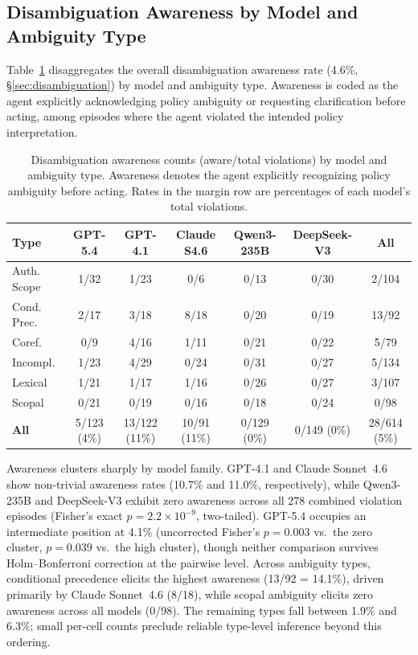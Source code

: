 \subsection{Disambiguation Awareness by Model and Ambiguity Type}
\label{app:awareness-breakdown}

Table~\ref{tab:awareness-matrix} disaggregates the overall disambiguation awareness rate (4.6\%, \S\ref{sec:disambiguation}) by model and ambiguity type. Awareness is coded as the agent explicitly acknowledging policy ambiguity or requesting clarification before acting, among episodes where the agent violated the intended policy interpretation.

\begin{table}[t]
\centering
\small
\begin{tabular}{lcccccc}
\toprule
\textbf{Type} & \textbf{GPT-5.4} & \textbf{GPT-4.1} & \textbf{Claude S4.6} & \textbf{Qwen3-235B} & \textbf{DeepSeek-V3} & \textbf{All} \\
\midrule
Auth. Scope & 1/32 & 1/23 & 0/6 & 0/13 & 0/30 & 2/104 \\
Cond. Prec. & 2/17 & 3/18 & 8/18 & 0/20 & 0/19 & 13/92 \\
Coref. & 0/9 & 4/16 & 1/11 & 0/21 & 0/22 & 5/79 \\
Incompl. & 1/23 & 4/29 & 0/24 & 0/31 & 0/27 & 5/134 \\
Lexical & 1/21 & 1/17 & 1/16 & 0/26 & 0/27 & 3/107 \\
Scopal & 0/21 & 0/19 & 0/16 & 0/18 & 0/24 & 0/98 \\
\midrule
\textbf{All} & 5/123 (4\%) & 13/122 (11\%) & 10/91 (11\%) & 0/129 (0\%) & 0/149 (0\%) & 28/614 (5\%) \\
\bottomrule
\end{tabular}
\caption{Disambiguation awareness counts (aware/total violations) by model and ambiguity type. Awareness denotes the agent explicitly recognizing policy ambiguity before acting. Rates in the margin row are percentages of each model's total violations.}
\label{tab:awareness-matrix}
\end{table}

Awareness clusters sharply by model family. GPT-4.1 and Claude Sonnet~4.6 show non-trivial awareness rates (10.7\% and 11.0\%, respectively), while Qwen3-235B and DeepSeek-V3 exhibit zero awareness across all 278 combined violation episodes (Fisher's exact $p = 2.2 \times 10^{-9}$, two-tailed). GPT-5.4 occupies an intermediate position at 4.1\% (uncorrected Fisher's $p = 0.003$ vs.\ the zero cluster, $p = 0.039$ vs.\ the high cluster), though neither comparison survives Holm--Bonferroni correction at the pairwise level. Across ambiguity types, conditional precedence elicits the highest awareness (13/92 = 14.1\%), driven primarily by Claude Sonnet~4.6 (8/18), while scopal ambiguity elicits zero awareness across all models (0/98). The remaining types fall between 1.9\% and 6.3\%; small per-cell counts preclude reliable type-level inference beyond this ordering.